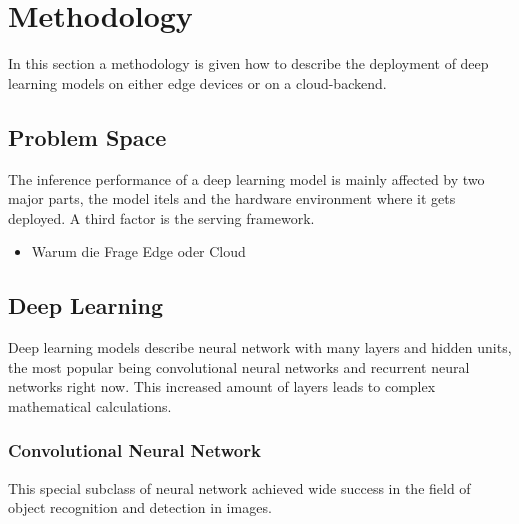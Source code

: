\chapter{Methodology}
In this section a methodology is given how to describe the deployment of deep learning models on either edge devices or on a cloud-backend.
\section{Problem Space}
The inference performance of a deep learning model is mainly affected by two major parts, the model itels and the hardware environment where it gets deployed. A third factor is the serving framework.
\begin{itemize}
    \item Warum die Frage Edge oder Cloud
\end{itemize}
\section{Deep Learning}
Deep learning models describe neural network with many layers and hidden units, the most popular being convolutional neural networks and recurrent neural networks right now. This increased amount of layers leads to complex mathematical calculations.
\subsection{Convolutional Neural Network}
This special subclass of neural network achieved wide success in the field of object recognition and detection in images. 
